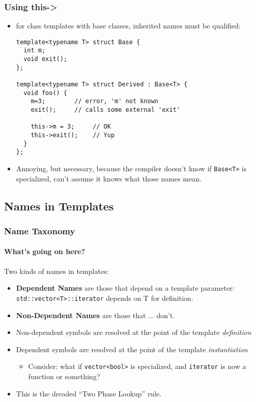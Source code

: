 \begin{frame}[fragile,t]
\frametitle{Using this->}

\begin{itemize}[<+->]
\item for class templates with base classes, inherited names must be
  qualified:
{\scriptsize
\begin{verbatim}
template<typename T> struct Base {
  int m;
  void exit(); 
};

template<typename T> struct Derived : Base<T> {
  void foo() {
    m=3;        // error, 'm' not known
    exit();     // calls some external 'exit'

    this->m = 3;     // OK
    this->exit();    // Yup
  }
};
\end{verbatim}
}

\item Annoying, but necessary, because the compiler doesn't know if
  \texttt{Base<T>} is specialized, can't assume  it knows what those
  names mean.

\end{itemize}

\end{frame}


\subsection {Names in Templates}
\begin{frame}[fragile,t]
\frametitle{Name Taxonomy}
\framesubtitle{What's going on here?}
Two kinds of names in templates:

\begin{itemize}[<+->]
\item {\bf Dependent Names} are those that depend on a template
  parameter: \texttt{std::vector<T>::iterator} depends on T for definition.
\item {\bf Non-Dependent Names} are those that ... don't.
\item Non-dependent symbols are resolved at the point of the template
  \emph{definition}
\item Dependent symbols are resolved at the point of the template \emph{instantiation}
 \begin{itemize}
  \item Consider: what if \texttt{vector<bool>} is specialized, and
    \texttt{iterator} is now a function or something?
  \end{itemize}
\item This is the dreaded ``Two Phase Lookup'' rule.
\end{itemize}

\end{frame}


